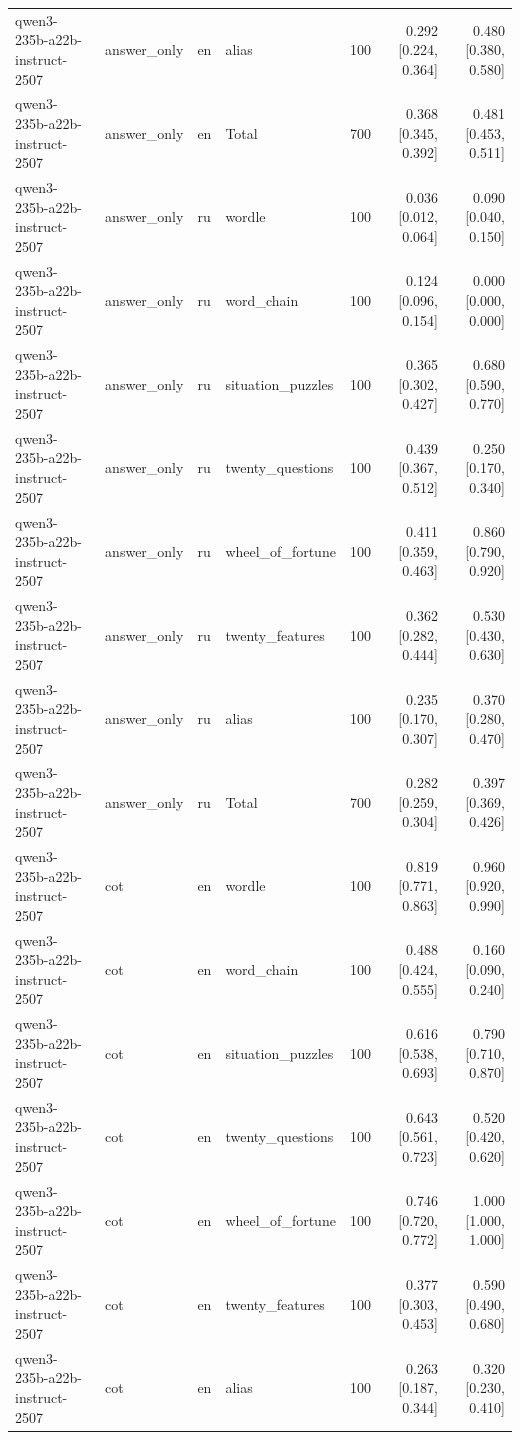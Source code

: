 \begin{longtable}{llllrrr}
qwen3-235b-a22b-instruct-2507 & answer\_only & en & alias & 100 & 0.292 [0.224, 0.364] & 0.480 [0.380, 0.580] \\
qwen3-235b-a22b-instruct-2507 & answer\_only & en & Total & 700 & 0.368 [0.345, 0.392] & 0.481 [0.453, 0.511] \\
qwen3-235b-a22b-instruct-2507 & answer\_only & ru & wordle & 100 & 0.036 [0.012, 0.064] & 0.090 [0.040, 0.150] \\
qwen3-235b-a22b-instruct-2507 & answer\_only & ru & word\_chain & 100 & 0.124 [0.096, 0.154] & 0.000 [0.000, 0.000] \\
qwen3-235b-a22b-instruct-2507 & answer\_only & ru & situation\_puzzles & 100 & 0.365 [0.302, 0.427] & 0.680 [0.590, 0.770] \\
qwen3-235b-a22b-instruct-2507 & answer\_only & ru & twenty\_questions & 100 & 0.439 [0.367, 0.512] & 0.250 [0.170, 0.340] \\
qwen3-235b-a22b-instruct-2507 & answer\_only & ru & wheel\_of\_fortune & 100 & 0.411 [0.359, 0.463] & 0.860 [0.790, 0.920] \\
qwen3-235b-a22b-instruct-2507 & answer\_only & ru & twenty\_features & 100 & 0.362 [0.282, 0.444] & 0.530 [0.430, 0.630] \\
qwen3-235b-a22b-instruct-2507 & answer\_only & ru & alias & 100 & 0.235 [0.170, 0.307] & 0.370 [0.280, 0.470] \\
qwen3-235b-a22b-instruct-2507 & answer\_only & ru & Total & 700 & 0.282 [0.259, 0.304] & 0.397 [0.369, 0.426] \\
qwen3-235b-a22b-instruct-2507 & cot & en & wordle & 100 & 0.819 [0.771, 0.863] & 0.960 [0.920, 0.990] \\
qwen3-235b-a22b-instruct-2507 & cot & en & word\_chain & 100 & 0.488 [0.424, 0.555] & 0.160 [0.090, 0.240] \\
qwen3-235b-a22b-instruct-2507 & cot & en & situation\_puzzles & 100 & 0.616 [0.538, 0.693] & 0.790 [0.710, 0.870] \\
qwen3-235b-a22b-instruct-2507 & cot & en & twenty\_questions & 100 & 0.643 [0.561, 0.723] & 0.520 [0.420, 0.620] \\
qwen3-235b-a22b-instruct-2507 & cot & en & wheel\_of\_fortune & 100 & 0.746 [0.720, 0.772] & 1.000 [1.000, 1.000] \\
qwen3-235b-a22b-instruct-2507 & cot & en & twenty\_features & 100 & 0.377 [0.303, 0.453] & 0.590 [0.490, 0.680] \\
qwen3-235b-a22b-instruct-2507 & cot & en & alias & 100 & 0.263 [0.187, 0.344] & 0.320 [0.230, 0.410] \\

\end{longtable}

